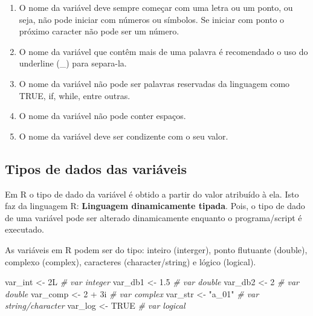\documentclass[
]{book}
\newenvironment{Shaded}{\begin{snugshade}}{\end{snugshade}}
\newcommand{\CommentTok}[1]{\textcolor[rgb]{0.56,0.35,0.01}{\textit{#1}}}
\newcommand{\ConstantTok}[1]{\textcolor[rgb]{0.00,0.00,0.00}{#1}}
\newcommand{\DecValTok}[1]{\textcolor[rgb]{0.00,0.00,0.81}{#1}}
\newcommand{\FloatTok}[1]{\textcolor[rgb]{0.00,0.00,0.81}{#1}}
\newcommand{\NormalTok}[1]{#1}
\newcommand{\OtherTok}[1]{\textcolor[rgb]{0.56,0.35,0.01}{#1}}
\newcommand{\SpecialCharTok}[1]{\textcolor[rgb]{0.00,0.00,0.00}{#1}}
\newcommand{\StringTok}[1]{\textcolor[rgb]{0.31,0.60,0.02}{#1}}
\begin{document}
\begin{enumerate}
\def\labelenumi{\arabic{enumi}.}
\item
  O nome da variável deve sempre começar com uma letra ou um ponto, ou seja, não pode iniciar com números ou símbolos. Se iniciar com ponto o próximo caracter não pode ser um número.
\item
  O nome da variável que contêm mais de uma palavra é recomendado o uso do underline (\_) para separa-la.
\item
  O nome da variável não pode ser palavras reservadas da linguagem como TRUE, if, while, entre outras.
\item
  O nome da variável não pode conter espaços.
\item
  O nome da variável deve ser condizente com o seu valor.
\end{enumerate}

\hypertarget{tipos-de-dados-das-variuxe1veis}{%
\subsection{Tipos de dados das variáveis}\label{tipos-de-dados-das-variuxe1veis}}

Em R o tipo de dado da variável é obtido a partir do valor atribuído à ela. Isto faz da linguagem R: \textbf{Linguagem dinamicamente tipada}. Pois, o tipo de dado de uma variável pode ser alterado dinamicamente enquanto o programa/script é executado.

As variáveis em R podem ser do tipo: inteiro (interger), ponto flutuante (double), complexo (complex), caracteres (character/string) e lógico (logical).

\begin{Shaded}
\begin{Highlighting}[]
\NormalTok{var\_int }\OtherTok{\textless{}{-}}\NormalTok{ 2L      }\CommentTok{\# var integer}
\NormalTok{var\_db1 }\OtherTok{\textless{}{-}} \FloatTok{1.5}     \CommentTok{\# var double}
\NormalTok{var\_db2 }\OtherTok{\textless{}{-}} \DecValTok{2}       \CommentTok{\# var double}
\NormalTok{var\_comp }\OtherTok{\textless{}{-}} \DecValTok{2} \SpecialCharTok{+}\NormalTok{ 3i }\CommentTok{\# var complex}
\NormalTok{var\_str }\OtherTok{\textless{}{-}} \StringTok{"a\_01"}  \CommentTok{\# var string/character}
\NormalTok{var\_log }\OtherTok{\textless{}{-}} \ConstantTok{TRUE}    \CommentTok{\# var logical}
\end{Highlighting}
\end{Shaded}
\end{document}
